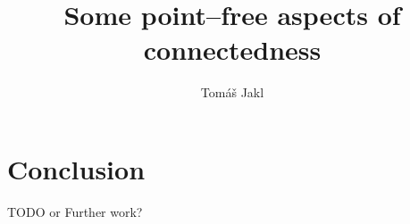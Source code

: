 \documentclass[12pt,a4paper]{report}
\title{Some point--free aspects of connectedness}
\author{Tom\'a\v s Jakl}
\newcounter{thmCounter}[section]
\theoremstyle{newthmstyle}
\newtheorem{lemma}[thmCounter]{Lemma}
\theoremstyle{newthmstyleNormal}
\begin{document}
\maketitle
\tableofcontents









\chapter{Conclusion}
TODO or Further work?


\nocite{*}



\clearpage
\printindex
\end{document}

